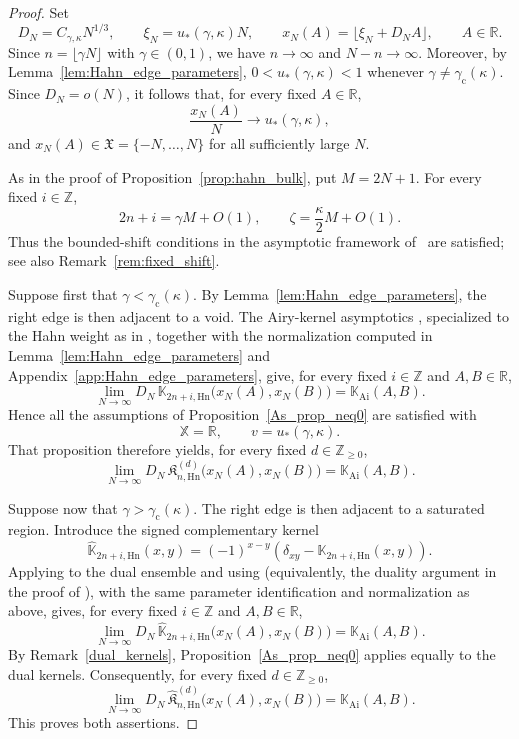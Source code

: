 \documentclass[reqno,11pt]{amsart}
\newcommand{\Khat}{\widehat{\mathfrak{K}}}
\newcommand{\ZZ}{\mathbb{Z}}
\newcommand{\RR}{\mathbb{R}}
\theoremstyle{plain}
\theoremstyle{definition}
\numberwithin{equation}{section}
\begin{document}
\begin{proof}
Set
\[
D_N=C_{\gamma,\kappa}N^{1/3},
\qquad
\xi_N=u_{\ast}(\gamma,\kappa)N,
\qquad
x_N(A)=\lfloor \xi_N+D_NA\rfloor,
\qquad A\in\RR.
\]
Since \(n=\lfloor\gamma N\rfloor\) with \(\gamma\in(0,1)\), we have
\(n\to\infty\) and \(N-n\to\infty\). Moreover, by
Lemma~\ref{lem:Hahn_edge_parameters}, 
$0<u_{\ast}(\gamma,\kappa)<1$
whenever \(\gamma\neq\gamma_{\mathrm c}(\kappa)\). Since \(D_N=o(N)\), it follows that, for every fixed \(A\in\RR\),
\[
\frac{x_N(A)}{N}\longrightarrow u_{\ast}(\gamma,\kappa),
\]
and \(x_N(A)\in\mathfrak X=\{-N,\ldots,N\}\) for all sufficiently
large \(N\).

As in the proof of Proposition~\ref{prop:hahn_bulk}, put $M=2N+1$.
For every fixed $i\in\ZZ$,
\[
2n+i=\gamma M+O(1),
\qquad
\zeta=\frac{\kappa}{2}M+O(1).
\]
Thus the bounded-shift conditions in the asymptotic framework
of~\cite{baik2007discrete} are satisfied; see also
Remark~\ref{rem:fixed_shift}.

Suppose first that
\(\gamma<\gamma_{\mathrm c}(\kappa)\). By
Lemma~\ref{lem:Hahn_edge_parameters}, the right edge is then adjacent
to a void. The Airy-kernel asymptotics
\cite[Theorem~3.7 and Lemma~7.16]{baik2007discrete}, specialized to
the Hahn weight as in
\cite[\S2.4.2 and Theorem~2.17]{baik2007discrete}, together with the
normalization computed in
Lemma~\ref{lem:Hahn_edge_parameters} and
Appendix~\ref{app:Hahn_edge_parameters}, give, for every fixed
\(i\in\ZZ\) and \(A,B\in\RR\),
\[
\lim_{N\to\infty}
D_N\,
\mathbb K_{2n+i,\mathrm{Hn}}
\bigl(x_N(A),x_N(B)\bigr)
=
\mathbb K_{\mathrm{Ai}}(A,B).
\]
Hence all the assumptions of Proposition~\ref{As_prop_neq0} are
satisfied with
\[
\mathbb X=\RR,
\qquad
v=u_{\ast}(\gamma,\kappa).
\]
That proposition therefore yields, for every fixed
\(d\in\ZZ_{\geq0}\),
\[
\lim_{N\to\infty}
D_N\,
\mathfrak K^{(d)}_{n,\mathrm{Hn}}
\bigl(x_N(A),x_N(B)\bigr)
=
\mathbb K_{\mathrm{Ai}}(A,B).
\]

Suppose now that
\(\gamma>\gamma_{\mathrm c}(\kappa)\). The right edge is then adjacent
to a saturated region. Introduce the signed complementary kernel
\[
\widehat{\mathbb K}_{2n+i,\mathrm{Hn}}(x,y)
=
(-1)^{x-y}
\left(
\delta_{xy}-\mathbb K_{2n+i,\mathrm{Hn}}(x,y)
\right).
\]
Applying \cite[Lemma~7.16]{baik2007discrete} to the dual ensemble and using \cite[Propositions~7.2 and~7.3]{baik2007discrete} (equivalently, the duality argument in the proof of \cite[Theorem~3.8]{baik2007discrete}), with the same parameter identification and normalization as above, gives, for every
fixed \(i\in\ZZ\) and \(A,B\in\RR\),
\[
\lim_{N\to\infty}
D_N\,
\widehat{\mathbb K}_{2n+i,\mathrm{Hn}}
\bigl(x_N(A),x_N(B)\bigr)
=
\mathbb K_{\mathrm{Ai}}(A,B).
\]
By Remark~\ref{dual_kernels},
Proposition~\ref{As_prop_neq0} applies equally to the dual kernels.
Consequently, for every fixed \(d\in\ZZ_{\geq0}\),
\[
\lim_{N\to\infty}
D_N\,
\Khat^{(d)}_{n,\mathrm{Hn}}
\bigl(x_N(A),x_N(B)\bigr)
=
\mathbb K_{\mathrm{Ai}}(A,B).
\]
This proves both assertions.
\end{proof}
\end{document}
